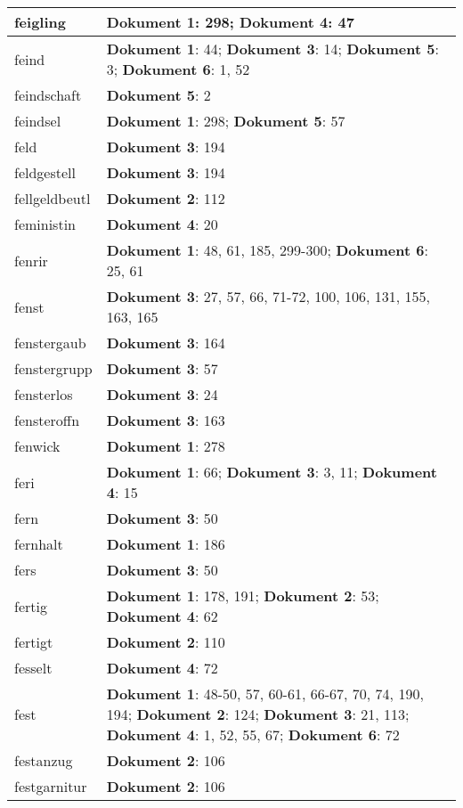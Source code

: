 \documentclass[a5paper]{article}
\begin{document}
\begin{longtable}[l]{|l|p{3in}|}
\hline
feigling & \textbf{Dokument 1}: 298; \textbf{Dokument 4}: 47 \\
\hline
feind & \textbf{Dokument 1}: 44; \textbf{Dokument 3}: 14; \textbf{Dokument 5}: 3; \textbf{Dokument 6}: 1, 52 \\
\hline
feindschaft & \textbf{Dokument 5}: 2 \\
\hline
feindsel & \textbf{Dokument 1}: 298; \textbf{Dokument 5}: 57 \\
\hline
feld & \textbf{Dokument 3}: 194 \\
\hline
feldgestell & \textbf{Dokument 3}: 194 \\
\hline
fellgeldbeutl & \textbf{Dokument 2}: 112 \\
\hline
feministin & \textbf{Dokument 4}: 20 \\
\hline
fenrir & \textbf{Dokument 1}: 48, 61, 185, 299-300; \textbf{Dokument 6}: 25, 61 \\
\hline
fenst & \textbf{Dokument 3}: 27, 57, 66, 71-72, 100, 106, 131, 155, 163, 165 \\
\hline
fenstergaub & \textbf{Dokument 3}: 164 \\
\hline
fenstergrupp & \textbf{Dokument 3}: 57 \\
\hline
fensterlos & \textbf{Dokument 3}: 24 \\
\hline
fensteroffn & \textbf{Dokument 3}: 163 \\
\hline
fenwick & \textbf{Dokument 1}: 278 \\
\hline
feri & \textbf{Dokument 1}: 66; \textbf{Dokument 3}: 3, 11; \textbf{Dokument 4}: 15 \\
\hline
fern & \textbf{Dokument 3}: 50 \\
\hline
fernhalt & \textbf{Dokument 1}: 186 \\
\hline
fers & \textbf{Dokument 3}: 50 \\
\hline
fertig & \textbf{Dokument 1}: 178, 191; \textbf{Dokument 2}: 53; \textbf{Dokument 4}: 62 \\
\hline
fertigt & \textbf{Dokument 2}: 110 \\
\hline
fesselt & \textbf{Dokument 4}: 72 \\
\hline
fest & \textbf{Dokument 1}: 48-50, 57, 60-61, 66-67, 70, 74, 190, 194; \textbf{Dokument 2}: 124; \textbf{Dokument 3}: 21, 113; \textbf{Dokument 4}: 1, 52, 55, 67; \textbf{Dokument 6}: 72 \\
\hline
festanzug & \textbf{Dokument 2}: 106 \\
\hline
festgarnitur & \textbf{Dokument 2}: 106 \\

\end{longtable}
\end{document}
